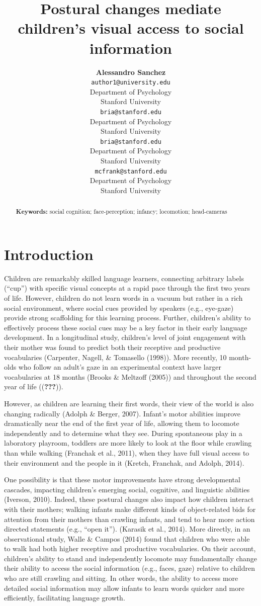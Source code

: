 \documentclass[10pt, letterpaper]{article}
\title{Postural changes mediate children's visual access to social information}
\author{{\large \bf Alessandro Sanchez} \\ \texttt{author1@university.edu} \\ Department of Psychology \\ Stanford University \And {\large \bf Bria Long} \\ \texttt{bria@stanford.edu} \\ Department of Psychology \\ Stanford University
    \And {\large \bf Ally Kraus} \\ \texttt{bria@stanford.edu} \\ Department of Psychology \\ Stanford University
    \And {\large \bf Michael C. Frank} \\ \texttt{mcfrank@stanford.edu} \\ Department of Psychology \\ Stanford University}
\begin{document}
\maketitle

\begin{abstract}


\textbf{Keywords:}
social cognition; face-perception; infancy; locomotion; head-cameras
\end{abstract}

\section{Introduction}\label{introduction}

Children are remarkably skilled language learners, connecting arbitrary
labels (``cup'') with specific visual concepts at a rapid pace through
the first two years of life. However, children do not learn words in a
vacuum but rather in a rich social environment, where social cues
provided by speakers (e.g., eye-gaze) provide strong scaffolding for
this learning process. Further, children's ability to effectively
process these social cues may be a key factor in their early language
development. In a longitudinal study, children's level of joint
engagement with their mother was found to predict both their receptive
and productive vocabularies (Carpenter, Nagell, \& Tomasello (1998)).
More recently, 10 month-olds who follow an adult's gaze in an
experimental context have larger vocabularies at 18 months (Brooks \&
Meltzoff (2005)) and throughout the second year of life
(({\textbf{???}})).

However, as children are learning their first words, their view of the
world is also changing radically (Adolph \& Berger, 2007). Infant's
motor abilities improve dramatically near the end of the first year of
life, allowing them to locomote independently and to determine what they
see. During spontaneous play in a laboratory playroom, toddlers are more
likely to look at the floor while crawling than while walking (Franchak
et al., 2011), when they have full visual access to their environment
and the people in it (Kretch, Franchak, and Adolph, 2014).

One possibility is that these motor improvements have strong
developmental cascades, impacting children's emerging social, cognitive,
and linguistic abilities (Iverson, 2010). Indeed, these postural changes
also impact how children interact with their mothers; walking infants
make different kinds of object-related bids for attention from their
mothers than crawling infants, and tend to hear more action directed
statements (e.g., ``open it''). (Karasik et al., 2014). More directly,
in an observational study, Walle \& Campos (2014) found that children
who were able to walk had both higher receptive and productive
vocabularies. On their account, children's ability to stand and
independently locomote may fundamentally change their ability to access
the social information (e.g., faces, gaze) relative to children who are
still crawling and sitting. In other words, the ability to access more
detailed social information may allow infants to learn words quicker and
more efficiently, facilitating language growth.
\end{document}
